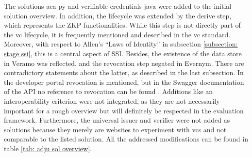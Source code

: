 	The solutions aca-py and verifiable-credentials-java were added to the initial solution overview. In addition, the lifecycle was extended by the derive step, which represents the \ac{ZKP} functionalities. While this step is not directly part of the \ac{vc} lifecycle, it is frequently mentioned and described in the \ac{vc} standard. Moreover, with respect to Allen's “Laws of Identity” in subsection \ref{subsection: stage ssi}, this is a central aspect of \ac{SSI}. Besides, the existence of the data store in Veramo was reflected, and the revocation step negated in Evernym. There are contradictory statements about the latter, as described in the last subsection. In the developer portal \cite{evernym_developer_2021} revocation is mentioned, but in the Swagger documentation of the API no reference to revocation can be found \cite{evernym_verity-rest-api_2021}. Additions like an interoperability criterion were not integrated, as they are not necessarily important for a rough overview but will definitely be respected in the evaluation framework. Furthermore, the universal issuer and verifier were not added as solutions because they merely are websites to experiment with \acp{vc} and not comparable to the listed solution. All the addressed modifications can be found in table \ref{tab: adju sol overview}.
	
